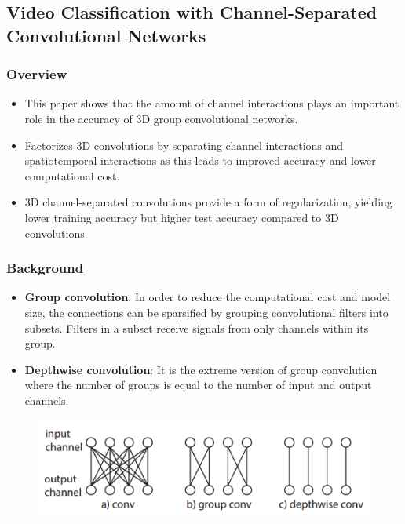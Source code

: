 \subsection{Video Classification with Channel-Separated Convolutional Networks}

\subsubsection{Overview}

\begin{itemize}
    \item This paper shows that the amount of channel interactions plays an important role in the accuracy of 3D group convolutional networks.
    \item Factorizes 3D convolutions by separating channel interactions and spatiotemporal interactions as this leads to improved accuracy and lower computational cost.
    \item 3D channel-separated convolutions provide a form of regularization, yielding lower training accuracy but higher test accuracy compared to 3D convolutions.
\end{itemize}

\subsubsection{Background}
\begin{itemize}
    \item \textbf{Group convolution}: In order to reduce the computational cost and model size, the connections can be sparsified by grouping convolutional filters into subsets. Filters in a subset receive signals from only channels within its group.
    \item \textbf{Depthwise convolution}: It is the extreme version of group convolution where the number of groups is equal to the number of input and output channels.     
\end{itemize}

\begin{figure}[H]
    \includegraphics[width=\linewidth]{assets/img/csn_1.png}
\end{figure}

